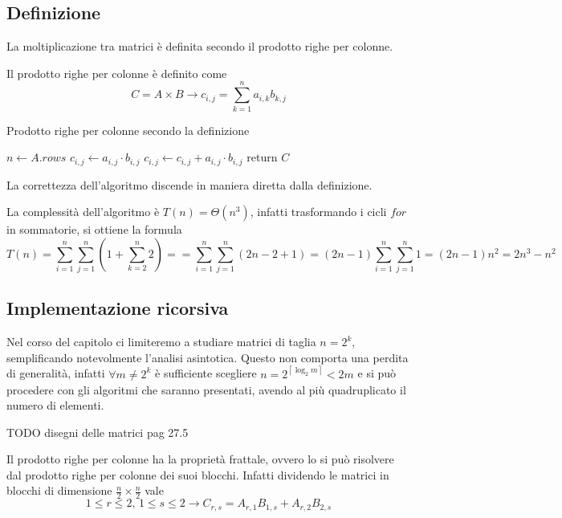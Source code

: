 \subsection{Definizione}
La moltiplicazione tra matrici è definita secondo il prodotto righe per colonne.
\begin{definition}
    Il prodotto righe per colonne è definito come
    \[
    C = A \times B \rightarrow
    c_{i,j} = \sum_{k=1}^{n}a_{i,k} b_{k,j}
    \]
    \label{def:prodrc}
\end{definition}
\begin{algorithm}[H]
\caption{Prodotto righe per colonne secondo la definizione}\label{alg:mulrcdef}
\begin{algorithmic}[1]
    \State $n \gets A.rows$
                \State $c_{i,j} \gets a_{i,j} \cdot b_{i,j} $
                \State $c_{i,j} \gets c_{i,j} + a_{i,j} \cdot b_{i,j} $
                \EndFor
            \EndFor
        \EndFor
    \State return $C$
\EndProcedure
\end{algorithmic}
\end{algorithm}
La correttezza dell'algoritmo discende in maniera diretta dalla definizione.

La complessità dell'algoritmo è $T(n) = \Theta (n^3)$, infatti trasformando i cicli $for$ in sommatorie, si ottiene la formula
\[
    T(n) = \sum_{i=1}^{n} \sum_{j=1}^{n} \left( 1 + \sum_{k=2}^{n} 2 \right) = 
    = \sum_{i=1}^{n} \sum_{j=1}^{n} \left( 2n-2+1 \right) 
    = \left( 2n-1 \right) \sum_{i=1}^{n} \sum_{j=1}^{n} 1 
    = (2n-1)n^2 = 2n^3 -n^2
\]

\subsection{Implementazione ricorsiva}
Nel corso del capitolo ci limiteremo a studiare matrici di taglia $n=2^k$, semplificando notevolmente l'analisi asintotica. Questo non comporta una perdita di generalità, infatti $\forall m \neq 2^k$ è sufficiente scegliere $n=2^{\left\lceil \log_2 m \right\rceil} < 2m$ e si può procedere con gli algoritmi che saranno presentati, avendo al più quadruplicato il numero di elementi.

TODO disegni delle matrici pag 27.5

Il prodotto righe per colonne ha la proprietà frattale, ovvero lo si può risolvere dal prodotto righe per colonne dei suoi blocchi.
Infatti dividendo le matrici in blocchi di dimensione $\frac{n}{2} \times \frac{n}{2}$ vale
\[
    1 \leq r \leq 2,\, 1 \leq s \leq 2 \rightarrow C_{r,s} = A_{r,1} B_{1,s} + A_{r,2} B_{2,s}
\]

